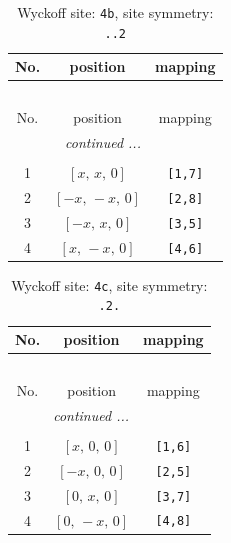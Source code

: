 \documentclass[fleqn,8pt]{jsarticle}
\begin{document}
\begin{longtable}{ccc}
\caption{Wyckoff site: {\tt 4b}, site symmetry: {\tt ..2}}
 \\
 \hline \hline
No. & position & mapping \\ \hline \endfirsthead

\multicolumn{2}{l}{\tablename\ \thetable{}} \\
 \hline \hline
No. & position & mapping \\ \hline \endhead

 \hline \hline
\multicolumn{2}{r}{\footnotesize\it continued ...} \\ \endfoot

 \hline \hline
\multicolumn{2}{r}{} \\ \endlastfoot

1 & $\left[ x,\, x,\, 0 \right]$ & {\tt [1,7]} \\ \hline
2 & $\left[ - x,\, - x,\, 0 \right]$ & {\tt [2,8]} \\ \hline
3 & $\left[ - x,\, x,\, 0 \right]$ & {\tt [3,5]} \\ \hline
4 & $\left[ x,\, - x,\, 0 \right]$ & {\tt [4,6]} \\
\end{longtable}
\renewcommand{\arraystretch}{1.2}
\begin{longtable}{ccc}
\caption{Wyckoff site: {\tt 4c}, site symmetry: {\tt .2.}}
 \\
 \hline \hline
No. & position & mapping \\ \hline \endfirsthead

\multicolumn{2}{l}{\tablename\ \thetable{}} \\
 \hline \hline
No. & position & mapping \\ \hline \endhead

 \hline \hline
\multicolumn{2}{r}{\footnotesize\it continued ...} \\ \endfoot

 \hline \hline
\multicolumn{2}{r}{} \\ \endlastfoot

1 & $\left[ x,\, 0,\, 0 \right]$ & {\tt [1,6]} \\ \hline
2 & $\left[ - x,\, 0,\, 0 \right]$ & {\tt [2,5]} \\ \hline
3 & $\left[ 0,\, x,\, 0 \right]$ & {\tt [3,7]} \\ \hline
4 & $\left[ 0,\, - x,\, 0 \right]$ & {\tt [4,8]} \\
\end{longtable}
\renewcommand{\arraystretch}{1.2}
\end{document}

